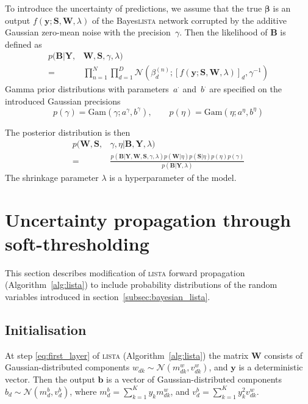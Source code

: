 \documentclass{article}
\begin{document}
  To introduce the uncertainty of predictions, we assume that the true $\boldsymbol\beta$ is an output $f(\mathbf{y} ; \mathbf{S}, \mathbf{W}, \lambda)$ of the Bayes\textsc{lista} network corrupted by the additive Gaussian zero-mean noise with the precision~$\gamma$. Then the likelihood of $\mathbf{B}$ is defined as
  \begin{equation}
  \label{eq:likelihood}
  \begin{split}
  p(\mathbf{B}| \mathbf{Y}, &\mathbf{W}, \mathbf{S}, \gamma, \lambda) \\
  = &\prod_{n=1}^N\prod_{d=1}^D\mathcal{N}\left(\beta_d^{(n)}; [f(\mathbf{y} ; \mathbf{S}, \mathbf{W}, \lambda)]_d, \gamma^{-1}\right)
 \end{split}
  \end{equation}
  Gamma prior distributions with parameters~$a^{\cdot}$ and~$b^{\cdot}$ are specified on the introduced Gaussian precisions
  \begin{equation}
  \label{eq:gamma_eta}
  p(\gamma) = \text{Gam}\left(\gamma; a^{\gamma}, b^{\gamma}\right), \qquad
  p(\eta) = \text{Gam}\left(\eta; 	a^{\eta}, b^{\eta}\right)
  \end{equation}
  
  The posterior distribution is then
  \begin{equation}
  \label{eq:posterior}
  \begin{split}
  p(\mathbf{W}, \mathbf{S}, &\gamma, \eta | \mathbf{B}, \mathbf{Y}, \lambda) \\
  = &\frac{p(\mathbf{B} | \mathbf{Y}, \mathbf{W},  \mathbf{S}, \gamma, \lambda) p(\mathbf{W} | \eta )p(\mathbf{S} | \eta) p(\eta) p(\gamma)}{p(\mathbf{B} | \mathbf{Y}, \lambda)}
  \end{split}
  \end{equation}
  The shrinkage parameter $\lambda$ is a hyperparameter of the model.
  
  \section{Uncertainty propagation through soft-thresholding}
  \label{sec:fprop}
  This section describes modification of \textsc{lista} forward propagation (Algorithm~\ref{alg:lista}) to include probability distributions of the random variables introduced in section~\ref{subsec:bayesian_lista}. 
  
  \subsection{Initialisation}
  \label{subsec:forward_init}
  At step \ref{eq:first_layer} of \textsc{lista} (Algorithm~\ref{alg:lista}) the matrix $\mathbf{W}$ consists of Gaussian-distributed components $w_{dk} \sim \mathcal{N}(m^w_{dk}, v^w_{dk})$, and $\mathbf{y}$ is a deterministic vector. Then the output $\mathbf{b}$ is a vector of Gaussian-distributed components $b_d \sim \mathcal{N}(m^b_d, v^b_d)$, where $m^b_d = \sum_{k=1}^Ky_k m^w_{dk}$, and $v^b_d = \sum_{k=1}^Ky_k^2v^w_{dk}$.
  
\end{document}
